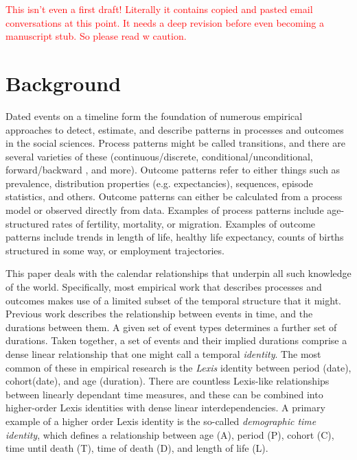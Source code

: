 \textcolor{red}{This isn't even a first draft! Literally it contains copied and pasted email conversations at this point. It needs a deep revision before even becoming a manuscript stub. So please read w caution.}

\section{Background}
Dated events on a timeline form the foundation of numerous empirical approaches to detect, estimate, and describe patterns in processes and outcomes in the social sciences. Process patterns might be called transitions, and there are several varieties of these (continuous/discrete, conditional/unconditional, forward/backward \citep{brouard2019backward}, and more). Outcome patterns refer to either things such as prevalence, distribution properties (e.g. expectancies), sequences, episode statistics, and others. Outcome patterns can either be calculated from a process model or observed directly from data. Examples of process patterns include age-structured rates of fertility, mortality, or migration. Examples of outcome patterns include trends in length of life, healthy life expectancy, counts of births structured in some way, or employment trajectories. 

This paper deals with the calendar relationships that underpin all such knowledge of the world. Specifically, most empirical work that describes processes and outcomes makes use of a limited subset of the temporal structure that it might. Previous work \citep{riffe2017demographictime} describes the relationship between events in time, and the durations between them. A given set of event types determines a further set of durations. Taken together, a set of events and their implied durations comprise a dense linear relationship that one might call a temporal \emph{identity}. The most common of these in empirical research is the \emph{Lexis} identity between period (date), cohort(date), and age (duration). There are countless Lexis-like relationships between linearly dependant time measures, and these can be combined into higher-order Lexis identities with dense linear interdependencies. A primary example of a higher order Lexis identity is the so-called \emph{demographic time identity}, which defines a relationship between age (A), period (P), cohort (C), time until death (T), time of death (D), and length of life (L). 

